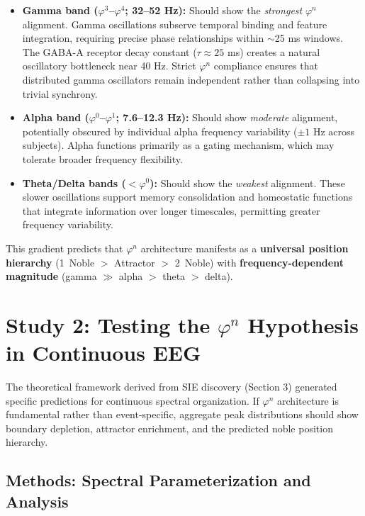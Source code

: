 \documentclass[11pt,a4paper]{article}
\newcommand{\phisym}{\varphi}
\begin{document}
\begin{itemize}
    \item \textbf{Gamma band ($\phisym^3$--$\phisym^4$; 32--52 Hz):} Should show the \textit{strongest} $\phisym^n$ alignment. Gamma oscillations subserve temporal binding and feature integration, requiring precise phase relationships within $\sim$25 ms windows. The GABA-A receptor decay constant ($\tau \approx 25$ ms) creates a natural oscillatory bottleneck near 40 Hz. Strict $\phisym^n$ compliance ensures that distributed gamma oscillators remain independent rather than collapsing into trivial synchrony.

    \item \textbf{Alpha band ($\phisym^0$--$\phisym^1$; 7.6--12.3 Hz):} Should show \textit{moderate} alignment, potentially obscured by individual alpha frequency variability ($\pm 1$ Hz across subjects). Alpha functions primarily as a gating mechanism, which may tolerate broader frequency flexibility.

    \item \textbf{Theta/Delta bands ($<\phisym^0$):} Should show the \textit{weakest} alignment. These slower oscillations support memory consolidation and homeostatic functions that integrate information over longer timescales, permitting greater frequency variability.
\end{itemize}

This gradient predicts that $\phisym^n$ architecture manifests as a \textbf{universal position hierarchy} (1\degree\ Noble $>$ Attractor $>$ 2\degree\ Noble) with \textbf{frequency-dependent magnitude} (gamma $\gg$ alpha $>$ theta $>$ delta).

\section{Study 2: Testing the $\phisym^n$ Hypothesis in Continuous EEG}

The theoretical framework derived from SIE discovery (Section 3) generated specific predictions for continuous spectral organization. If $\phisym^n$ architecture is fundamental rather than event-specific, aggregate peak distributions should show boundary depletion, attractor enrichment, and the predicted noble position hierarchy.

\subsection{Methods: Spectral Parameterization and Analysis}
\end{document}
